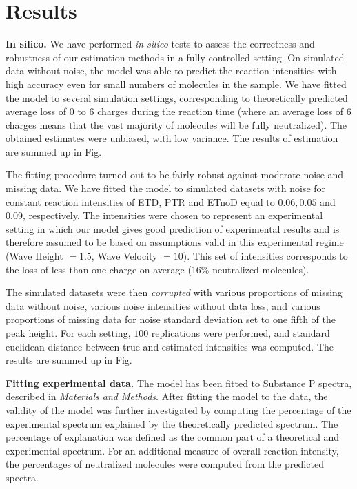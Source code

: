 \documentclass{llncs}
\begin{document}
        \section{Results}

        \textbf{In silico.} We have performed \textit{in silico} tests to assess the correctness and robustness of our estimation methods in a fully controlled setting. On simulated data without noise, the model was able to predict the reaction intensities with high accuracy even for small numbers of molecules in the sample. We have fitted the model to several simulation settings, corresponding to theoretically predicted average loss of 0 to 6 charges during the reaction time (where an average loss of 6 charges means that the vast majority of molecules will be fully neutralized). The obtained estimates were unbiased, with low variance. The results of estimation are summed up in Fig.

        The fitting procedure turned out to be fairly robust against moderate noise and missing data. We have fitted the model to simulated datasets with noise for constant reaction intensities of ETD, PTR and ETnoD equal to $0.06, 0.05$ and $0.09$, respectively. The intensities were chosen to represent an experimental setting in which our model gives good prediction of experimental results and is therefore assumed to be based on assumptions valid in this experimental regime (Wave Height $= 1.5$, Wave Velocity $= 10$). This set of intensities corresponds to the loss of less than one charge on average (16\% neutralized molecules).

        The simulated datasets were then \textit{corrupted} with various proportions of missing data without noise, various noise intensities without data loss, and various proportions of missing data for noise standard deviation set to one fifth of the peak height. For each setting, $100$ replications were performed, and standard euclidean distance between true and estimated intensities was computed. The results are summed up in Fig.

        \textbf{Fitting experimental data.}
        The model has been fitted to Substance P spectra, described in \textit{Materials and Methods}. After fitting the model to the data, the validity of the model was further investigated by computing the percentage of the experimental spectrum explained by the theoretically predicted spectrum. The percentage of explanation was defined as the common part of a theoretical and experimental spectrum. For an additional measure of overall reaction intensity, the percentages of neutralized molecules were computed from the predicted spectra.
\end{document}
